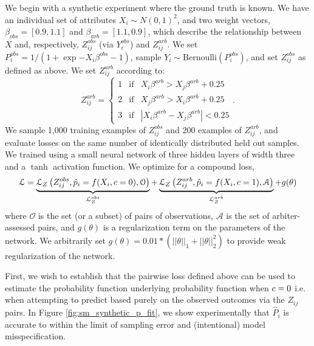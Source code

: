         We begin with a synthetic experiment where the ground truth is known.  We have an individual set of attributes $X_i \sim N(0, 1)^2$, and two weight vectors,  $\beta_{obs} = [0.9, 1.1]$ and $\beta_{arb} = [1.1, 0.9]$, which describe the relationship between $X$ and, respectively,  $Z_{ij}^{obs}$ (via $Y_{i}^{obs}$) and $Z_{ij}^{arb}$.  We set $P_i^{obs} = 1 / (1 + \exp{-X_i \beta^{obs} - 1})$, sample $Y_i \sim \mbox{Bernoulli}(P_i^{obs})$, and set $Z_{ij}^{obs}$ as defined as above.  We set $Z_{ij}^{arb}$ according to:
            $$ Z_{ij}^{arb} = \left\{ \begin{array}{lll}
                    1 & \mbox{if} & X_{i}\beta^{arb} > X_{j}\beta^{arb} + 0.25\\
                    2 & \mbox{if} & X_{j}\beta^{arb} > X_{i}\beta^{arb} + 0.25 \\
                    3 & \mbox{if} & | X_{i}\beta^{arb} - X_{j}\beta^{arb} | < 0.25
                \end{array} \right. .$$
        We sample 1,000 training examples of $Z_{ij}^{obs}$ and 200 examples of $Z_{ij}^{arb}$, and evaluate losses on the same number of identically distributed held out samples.  We trained using a small neural network of three hidden layers of width three and a $\tanh$ activation function. We optimize for a compound loss,
            $$\mathcal{L} = \underbrace{\mathcal{L}_Z\left(Z_{ij}^{obs}, \hat{p}_i = f(X_i, c = 0), \mathcal{O} \right)}_{\mathcal{L}_Z^{obs}}
                          + \underbrace{\mathcal{L}_Z\left(Z_{ij}^{arb}, \hat{p}_i = f(X_i, c = 1), \mathcal{A} \right)}_{\mathcal{L}_Z^{arb}} 
                          + g(\theta)$$
        where $\mathcal{O}$ is the set (or a subset) of pairs of observations, $\mathcal{A}$ is the set of arbiter-assessed pairs, and $g(\theta)$ is a regularization term on the parameters of the network.  We arbitrarily set $g(\theta) = 0.01 * \left(||\theta||_1 + ||\theta||_2^2\right)$ to provide weak regularization of the network.
        
        First, we wish to establish that the pairwise loss defined above can be used to estimate the probability function underlying probability function when $c = 0$ i.e. when attempting to predict based purely on the observed outcomes via the $Z_{ij}$ pairs.  In Figure \ref{fig:sm_synthetic_p_fit}, we show experimentally that $\hat{P}_i$ is accurate to within the limit of sampling error and (intentional) model misspecification.
        
